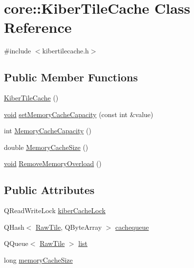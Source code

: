 \hypertarget{classcore_1_1_kiber_tile_cache}{\section{core\-:\-:\-Kiber\-Tile\-Cache \-Class \-Reference}
\label{classcore_1_1_kiber_tile_cache}
}


{\ttfamily \#include $<$kibertilecache.\-h$>$}

\subsection*{\-Public \-Member \-Functions}
\begin{DoxyCompactItemize}
\item 
\hyperlink{group___o_p_map_widget_gab36dfabac7ab5e960efd54b890b15173}{\-Kiber\-Tile\-Cache} ()
\item 
\hyperlink{group___u_a_v_objects_plugin_ga444cf2ff3f0ecbe028adce838d373f5c}{void} \hyperlink{group___o_p_map_widget_ga53ccfe7e5f07ce218a4920d86b7fa95e}{set\-Memory\-Cache\-Capacity} (const int \&value)
\item 
int \hyperlink{group___o_p_map_widget_ga1ac798743593d55d294a659bf03cd367}{\-Memory\-Cache\-Capacity} ()
\item 
double \hyperlink{group___o_p_map_widget_ga79164b194a65febe6f0b0f29fec3e002}{\-Memory\-Cache\-Size} ()
\item 
\hyperlink{group___u_a_v_objects_plugin_ga444cf2ff3f0ecbe028adce838d373f5c}{void} \hyperlink{group___o_p_map_widget_ga7c3b50dd97465e188bb3e322b9717c5f}{\-Remove\-Memory\-Overload} ()
\end{DoxyCompactItemize}
\subsection*{\-Public \-Attributes}
\begin{DoxyCompactItemize}
\item 
\-Q\-Read\-Write\-Lock \hyperlink{group___o_p_map_widget_ga33731aa2cecd7ba1200e9871f3380308}{kiber\-Cache\-Lock}
\item 
\-Q\-Hash$<$ \hyperlink{classcore_1_1_raw_tile}{\-Raw\-Tile}, \-Q\-Byte\-Array $>$ \hyperlink{group___o_p_map_widget_ga632c3be1045d7e97d09885aba0c18100}{cachequeue}
\item 
\-Q\-Queue$<$ \hyperlink{classcore_1_1_raw_tile}{\-Raw\-Tile} $>$ \hyperlink{group___o_p_map_widget_ga097b545fed7bd5b8be78160165f4f6f5}{list}
\item 
long \hyperlink{group___o_p_map_widget_gae96e4700fe984a52afd8c8016dc1295b}{memory\-Cache\-Size}
\end{DoxyCompactItemize}


